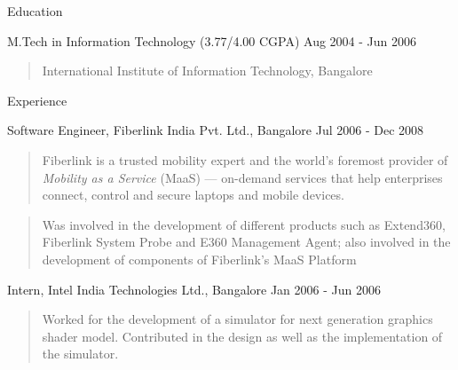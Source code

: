 \documentclass{resume}
\author{Ashish Tulsian}
\begin{document}
 \maketitle

\begin{category}{Education}{}

    \item {\topic M.Tech in Information Technology}
        {\footnotesize(3.77/4.00 CGPA)}
        {\period Aug 2004 - Jun 2006}
        \begin{quote}
            International Institute of Information Technology, Bangalore
        \end{quote}

\end{category}


\begin{category}{Experience}{}

    \item {\topic Software Engineer,} Fiberlink India Pvt. Ltd., Bangalore
        {\period Jul 2006 - Dec 2008}
        \begin{quote}
            Fiberlink is a trusted mobility expert and the world's foremost
            provider of {\em Mobility as a Service} (MaaS) --- on-demand
            services that help enterprises connect, control and secure laptops
            and mobile devices.
        \end{quote}
        \begin{quote}
            Was involved in the development of different products such as
            Extend360, Fiberlink System Probe and E360 Management Agent; also
            involved in the development of components of Fiberlink's MaaS
            Platform
        \end{quote}

    \item {\topic Intern,} Intel India Technologies Ltd., Bangalore
        {\period Jan 2006 - Jun 2006}
        \begin{quote}
            Worked for the development of a simulator for next generation
            graphics shader model. Contributed in the design as well as the
            implementation of the simulator.
        \end{quote}

\end{category}
\end{document}

